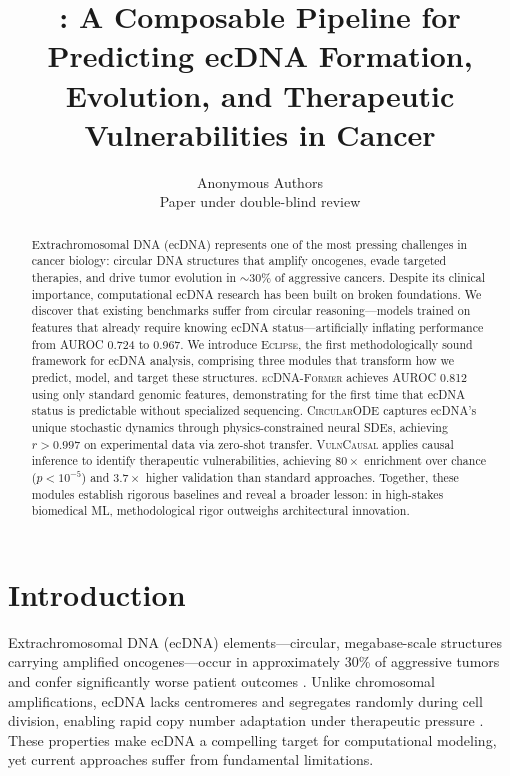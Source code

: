 \documentclass{article}
\title{\eclipse{}: A Composable Pipeline for Predicting ecDNA Formation, Evolution, and Therapeutic Vulnerabilities in Cancer}
\author{Anonymous Authors \\
Paper under double-blind review}
\newcommand{\eclipse}{\textsc{Eclipse}}
\newcommand{\former}{\textsc{ecDNA-Former}}
\newcommand{\circularode}{\textsc{CircularODE}}
\newcommand{\vulncausal}{\textsc{VulnCausal}}
\begin{document}
\maketitle

\begin{abstract}
Extrachromosomal DNA (ecDNA) represents one of the most pressing challenges in cancer biology: circular DNA structures that amplify oncogenes, evade targeted therapies, and drive tumor evolution in $\sim$30\% of aggressive cancers. Despite its clinical importance, computational ecDNA research has been built on broken foundations. We discover that existing benchmarks suffer from circular reasoning---models trained on features that already require knowing ecDNA status---artificially inflating performance from AUROC 0.724 to 0.967. We introduce \eclipse{}, the first methodologically sound framework for ecDNA analysis, comprising three modules that transform how we predict, model, and target these structures. \former{} achieves AUROC 0.812 using only standard genomic features, demonstrating for the first time that ecDNA status is predictable without specialized sequencing. \circularode{} captures ecDNA's unique stochastic dynamics through physics-constrained neural SDEs, achieving $r > 0.997$ on experimental data via zero-shot transfer. \vulncausal{} applies causal inference to identify therapeutic vulnerabilities, achieving $80\times$ enrichment over chance ($p < 10^{-5}$) and $3.7\times$ higher validation than standard approaches. Together, these modules establish rigorous baselines and reveal a broader lesson: in high-stakes biomedical ML, methodological rigor outweighs architectural innovation.
\end{abstract}


\section{Introduction}
\label{sec:intro}

Extrachromosomal DNA (ecDNA) elements---circular, megabase-scale structures carrying amplified oncogenes---occur in approximately 30\% of aggressive tumors and confer significantly worse patient outcomes \citep{kim_2020_ecdna_prognosis}. Unlike chromosomal amplifications, ecDNA lacks centromeres and segregates randomly during cell division, enabling rapid copy number adaptation under therapeutic pressure \citep{nathanson_2014_targeted, lange_2022_mathematical}. These properties make ecDNA a compelling target for computational modeling, yet current approaches suffer from fundamental limitations.
\end{document}
